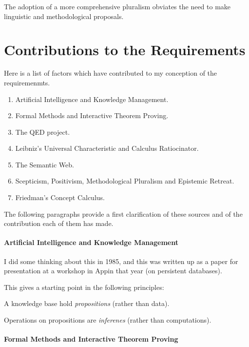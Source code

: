 The adoption of a more comprehensive pluralism obviates the need to make linguistic and methodological proposals.






\section{Contributions to the Requirements}

Here is a list of factors which have contributed to my conception of the requiremenmts.

\begin{enumerate}
\item Artificial Intelligence and Knowledge Management.
\item Formal Methods and Interactive Theorem Proving.
\item The QED project.
\item Leibniz's Universal Characteristic and Calculus Ratiocinator.
\item The Semantic Web.
\item Scepticism, Positivism, Methodological Pluralism and Epistemic Retreat.
\item Friedman's Concept Calculus.
\end{enumerate}

The following paragraphs provide a first clarification of these sources and of the contribution each of them has made.

\paragraph{Artificial Intelligence and Knowledge Management}

I did some thinking about this in 1985, and this was written up as a paper for presentation at a workshop in Appin that year (on persistent databases)\cite{Jones85}.

This gives a starting point in the following principles:

\begin{iprin}
A knowledge base hold \emph{propositions} (rather than data).
\end{iprin}

\begin{iprin}
Operations on propositions are \emph{inferenes} (rather than computations).
\end{iprin}

\paragraph{Formal Methods and Interactive Theorem Proving}

